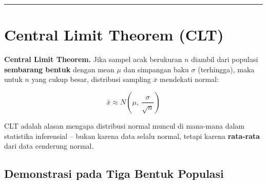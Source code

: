 \documentclass[
  indonesian,
  letterpaper,
]{book}
\begin{document}
\begin{center}\rule{0.5\linewidth}{0.5pt}\end{center}

\section{Central Limit Theorem (CLT)}\label{central-limit-theorem-clt}

\textbf{Central Limit Theorem.} Jika sampel acak berukuran \(n\) diambil
dari populasi \textbf{sembarang bentuk} dengan mean \(\mu\) dan
simpangan baku \(\sigma\) (terhingga), maka untuk \(n\) yang cukup
besar, distribusi sampling \(\bar{x}\) mendekati normal:

\[\bar{x} \approx N\!\left(\mu,\ \frac{\sigma}{\sqrt{n}}\right)\]

CLT adalah alasan mengapa distribusi normal muncul di mana-mana dalam
statistika inferensial -- bukan karena data selalu normal, tetapi karena
\textbf{rata-rata} dari data cenderung normal.

\subsection{Demonstrasi pada Tiga Bentuk
Populasi}\label{demonstrasi-pada-tiga-bentuk-populasi}
\end{document}
